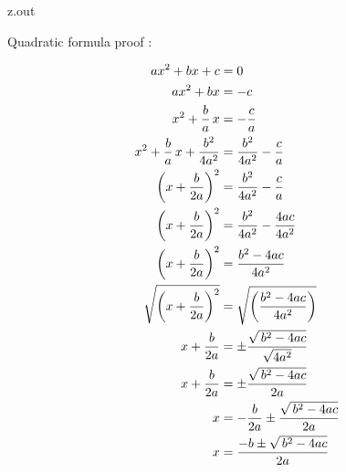 \MyIOT


\begin{VerbatimOut}{z.out}
  
Quadratic formula proof \cite{khan}:

\begin{align}
  ax^2 + bx + c &= 0\\
  ax^2 + bx &= -c\notag\\
  x^2 + \frac ba\,x &= -\frac ca\notag\\
  x^2 + \frac ba\,x + \frac{b^2}{4a^2} &= \frac{b^2}{4a^2} - \frac ca\notag\\
  \left(x + \frac b{2a}\right)^2 &= \frac{b^2}{4a^2} - \frac ca\notag\\
  \left(x + \frac b{2a}\right)^2 &= \frac{b^2}{4a^2} - \frac{4ac}{4a^2}\notag\\
  \left(x + \frac b{2a}\right)^2 &= \frac{b^2-4ac}{4a^2}\notag\\
  \sqrt{\left(x + \frac b{2a}\right)^2}
    &= \sqrt{\left(\frac{b^2-4ac}{4a^2}\right)}\notag\\
  x + \frac b{2a} &= \pm \frac{\sqrt{\,b^2-4ac}}{\sqrt{4a^2}}\notag\\
  x + \frac b{2a} &= \pm \frac{\sqrt{\,b^2-4ac}}{2a}\notag\\
  x &= - \frac b{2a} \pm \frac{\sqrt{\,b^2-4ac}}{2a}\notag\\
  x &= \frac{-b \pm \sqrt{\,b^2-4ac}}{2a}
\end{align}
\end{VerbatimOut}

\MyIOT


